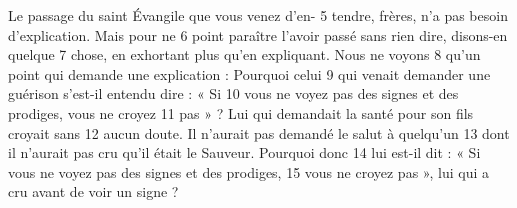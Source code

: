 Le passage du saint Évangile que vous venez d'en-	 
5	 	tendre, frères, n'a pas besoin d'explication. Mais pour ne	 
6	 	point paraître l'avoir passé sans rien dire, disons-en quelque	 
7	 	chose, en exhortant plus qu'en expliquant. Nous ne voyons	 
8	 	qu'un point qui demande une explication : Pourquoi celui	 
9	 	qui venait demander une guérison s'est-il entendu dire : « Si	 
10	 	vous ne voyez pas des signes et des prodiges, vous ne croyez	 
11	 	pas » ? Lui qui demandait la santé pour son fils croyait sans	 
12	 	aucun doute. Il n'aurait pas demandé le salut à quelqu'un	 
13	 	dont il n'aurait pas cru qu'il était le Sauveur. Pourquoi donc	 
14	 	lui est-il dit : « Si vous ne voyez pas des signes et des prodiges,	 
15	 	vous ne croyez pas », lui qui a cru avant de voir un signe ?